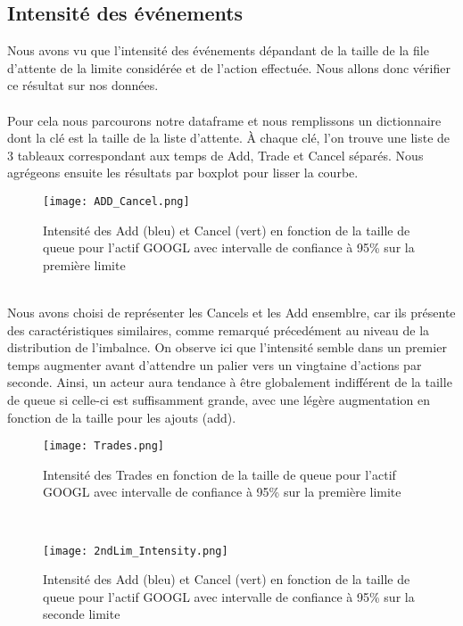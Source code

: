 \documentclass[12pt,a4paper]{article}
\theoremstyle{definition}
\theoremstyle{remark}
\begin{document}
\subsection{Intensité des événements}
Nous avons vu que l'intensité des événements dépandant de la taille de la file d'attente de la limite considérée et de 
l'action effectuée. Nous allons donc vérifier ce résultat sur nos données. 
\\
\\
Pour cela nous parcourons notre dataframe et nous remplissons un dictionnaire
 dont la clé est la taille de la liste d'attente. À chaque clé, l'on trouve une liste de 3 tableaux correspondant aux temps de Add, Trade et Cancel séparés. Nous agrégeons ensuite les résultats par boxplot pour lisser la courbe.
\begin{figure}[h!]
    \centering
    \texttt{[image: ADD\_Cancel.png]}
    \caption{Intensité des Add (bleu) et Cancel (vert) en fonction de la taille de queue pour l'actif GOOGL avec intervalle de confiance à 95\% sur la première limite}
    \label{fig:add_cancel}
\end{figure}
\\
Nous avons choisi de représenter les Cancels et les Add ensemblre, car ils présente des caractéristiques similaires, comme remarqué précedément au niveau de la distribution de l'imbalnce. On observe ici que l’intensité semble dans un premier temps augmenter avant d'attendre un palier vers un vingtaine d'actions par seconde. Ainsi, un acteur aura tendance à être globalement indifférent de la taille de queue si celle-ci est suffisamment grande, avec une légère augmentation en fonction de la taille pour les ajouts (add).
\begin{figure}[h!]
    \centering
    \texttt{[image: Trades.png]}
    \caption{Intensité des Trades en fonction de la taille de queue pour l'actif GOOGL avec intervalle de confiance à 95\% sur la première limite}
    \label{fig:trades}
\end{figure}
\\
\begin{figure}[h!]
    \centering
    \texttt{[image: 2ndLim\_Intensity.png]}
    \caption{Intensité des Add (bleu) et Cancel (vert) en fonction de la taille de queue pour l'actif GOOGL avec intervalle de confiance à 95\% sur la seconde limite}
    \label{fig:trades}
\end{figure}
\end{document}
